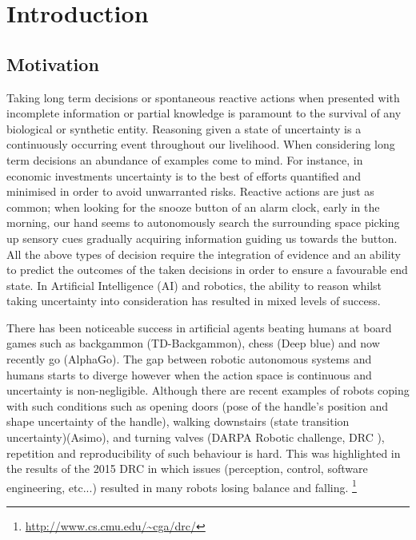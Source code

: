 \chapter{Introduction}

\section{Motivation}


Taking long term decisions or spontaneous reactive actions when presented with incomplete information or partial knowledge is 
paramount to the survival of any biological or synthetic entity. Reasoning given a state of uncertainty is a continuously occurring event throughout our 
livelihood. When considering long term decisions an abundance of examples come to mind. For instance, in economic investments 
uncertainty is to the best of efforts quantified and minimised in order to avoid unwarranted risks. Reactive actions are just as common; 
when looking for the snooze button of an alarm clock, early in the morning, our hand seems to autonomously search the surrounding space picking up
sensory cues gradually acquiring information guiding us towards the button. All the above types of decision require the integration of 
evidence and an ability to predict the outcomes of the taken decisions in order to ensure a favourable end state. 
In Artificial Intelligence (AI) and robotics, the ability to reason whilst taking uncertainty into consideration has resulted in mixed levels of success. 


There has been noticeable success in artificial agents beating humans at board games such as backgammon 
(TD-Backgammon), chess (Deep blue) and now recently go (AlphaGo). The gap between robotic autonomous systems and humans  starts to diverge however when the action space is continuous and 
uncertainty is non-negligible. Although there are recent examples of robots coping with such conditions such as opening doors (pose  of the handle's position and shape uncertainty of the handle),
walking downstairs (state transition uncertainty)(Asimo), and turning valves (DARPA Robotic challenge, DRC \cite{DARPA_2015}), 
repetition and reproducibility of such behaviour is hard. This was highlighted in the results of the 2015 DRC in which issues 
(perception, control, software engineering, etc...) resulted in many robots
losing balance and falling. \footnote{\url{http://www.cs.cmu.edu/~cga/drc/}} 

